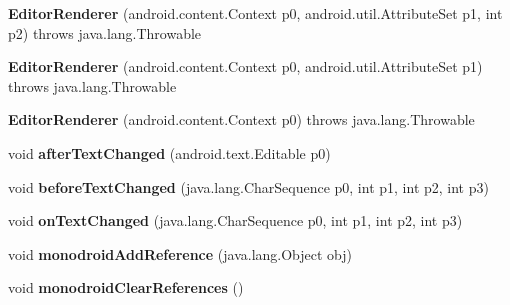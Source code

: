 \begin{DoxyCompactItemize}
\item 
\mbox{\label{classmd5b60ffeb829f638581ab2bb9b1a7f4f3f_1_1_editor_renderer_a126a5ef185db22511cc66e9cafd0d310}} 
{\bfseries Editor\+Renderer} (android.\+content.\+Context p0, android.\+util.\+Attribute\+Set p1, int p2)  throws java.\+lang.\+Throwable 	
\item 
\mbox{\label{classmd5b60ffeb829f638581ab2bb9b1a7f4f3f_1_1_editor_renderer_aea191623f560a580a117cd8f184e59b3}} 
{\bfseries Editor\+Renderer} (android.\+content.\+Context p0, android.\+util.\+Attribute\+Set p1)  throws java.\+lang.\+Throwable 	
\item 
\mbox{\label{classmd5b60ffeb829f638581ab2bb9b1a7f4f3f_1_1_editor_renderer_a2bc23540ae25cddc293e56ebaef99158}} 
{\bfseries Editor\+Renderer} (android.\+content.\+Context p0)  throws java.\+lang.\+Throwable 	
\item 
\mbox{\label{classmd5b60ffeb829f638581ab2bb9b1a7f4f3f_1_1_editor_renderer_a7cc8b388893791b82894b01e4627508d}} 
void {\bfseries after\+Text\+Changed} (android.\+text.\+Editable p0)
\item 
\mbox{\label{classmd5b60ffeb829f638581ab2bb9b1a7f4f3f_1_1_editor_renderer_a96753b901a17611aedda80e2aa4801f8}} 
void {\bfseries before\+Text\+Changed} (java.\+lang.\+Char\+Sequence p0, int p1, int p2, int p3)
\item 
\mbox{\label{classmd5b60ffeb829f638581ab2bb9b1a7f4f3f_1_1_editor_renderer_a5c47c614038fade51dab2c5f57a02d43}} 
void {\bfseries on\+Text\+Changed} (java.\+lang.\+Char\+Sequence p0, int p1, int p2, int p3)
\item 
\mbox{\label{classmd5b60ffeb829f638581ab2bb9b1a7f4f3f_1_1_editor_renderer_ad947b0fcb8dfc7fa6df3ad187936d3be}} 
void {\bfseries monodroid\+Add\+Reference} (java.\+lang.\+Object obj)
\item 
\mbox{\label{classmd5b60ffeb829f638581ab2bb9b1a7f4f3f_1_1_editor_renderer_ab75e496c1b4ff6e3f542989834b44b8d}} 
void {\bfseries monodroid\+Clear\+References} ()
\end{DoxyCompactItemize}
